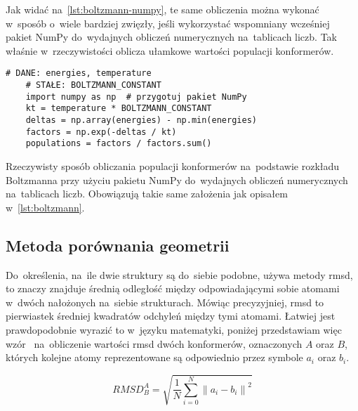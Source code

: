 Jak widać na~\cref{lst:boltzmann-numpy}, te same obliczenia można wykonać w~sposób o~wiele
  bardziej zwięzły, jeśli wykorzystać wspomniany wcześniej pakiet NumPy do~wydajnych obliczeń
  numerycznych na~tablicach liczb.
Tak właśnie \tesliper{} w~rzeczywistości oblicza ułamkowe wartości populacji konformerów.

\begin{listing}
  \begin{lstlisting}[emph={energies, temperature, BOLTZMANN_CONSTANT}]
    # DANE: energies, temperature
    # STAŁE: BOLTZMANN_CONSTANT
    import numpy as np  # przygotuj pakiet NumPy
    kt = temperature * BOLTZMANN_CONSTANT
    deltas = np.array(energies) - np.min(energies)
    factors = np.exp(-deltas / kt)
    populations = factors / factors.sum()
  \end{lstlisting}
  \caption{
    Rzeczywisty sposób obliczania populacji konformerów na~podstawie rozkładu Boltzmanna
      przy użyciu pakietu NumPy do~wydajnych obliczeń numerycznych na~tablicach liczb.
    Obowiązują takie same założenia jak opisałem w~\protect\cref{lst:boltzmann}.
  }\label{lst:boltzmann-numpy}
\end{listing}

\subsection{Metoda porównania geometrii}\label{implementation:rmsd}
Do~określenia, na~ile dwie struktury są do~siebie podobne, \tesliper{} używa metody \gls{rmsd},
  to znaczy znajduje średnią odległość między odpowiadającymi sobie atomami w~dwóch nałożonych
  na~siebie strukturach.
Mówiąc precyzyjniej, \gls{rmsd} to pierwiastek średniej kwadratów odchyleń między tymi atomami.
Łatwiej jest prawdopodobnie wyrazić to w~języku matematyki, poniżej przedstawiam więc
  wzór~ na~obliczenie wartości \gls{rmsd} dwóch konformerów, oznaczonych
  $A$ oraz $B$, których kolejne atomy reprezentowane są odpowiednio przez symbole $a_i$ oraz $b_i$.

\begin{equation}\label{eq:rmsd}
  RMSD^A_B = \sqrt{\frac{1}{N}\sum\limits_{i=0}^N \left\| a_i-b_i \right\|^2}
\end{equation}

